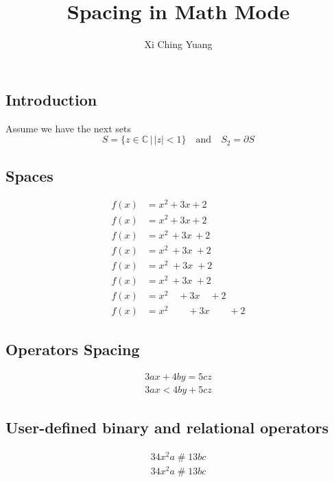 \documentclass{article}
\title{Spacing in Math Mode}
\author{Xi Ching Yuang}
\begin{document}
\maketitle

\subsection*{Introduction}
Assume we have the next sets
\[
S = \{ z \in \mathbb{C}\, |\, |z| < 1 \} \quad \textrm{and} \quad S_2=\partial{S}
\]

\subsection*{Spaces}

\begin{align*}
	f(x) &= x^2\! +3x\! +2 \\
	f(x) &= x^2+3x+2 \\
	f(x) &= x^2\, +3x\, +2 \\
	f(x) &= x^2\: +3x\: +2 \\
	f(x) &= x^2\; +3x\; +2 \\
	f(x) &= x^2\ +3x\ +2 \\
	f(x) &= x^2\quad +3x\quad +2 \\
	f(x) &= x^2\qquad +3x\qquad +2
\end{align*}

\subsection*{Operators Spacing}
\begin{align*}
	3ax+4by=5cz\\
	3ax<4by+5cz
\end{align*}

\subsection*{User-defined binary and relational operators}
\begin{align*}
	34x^2a \mathbin{\#} 13bc \\
	34x^2a \mathrel{\#} 13bc
	\end{align*}
	
\end{document}
